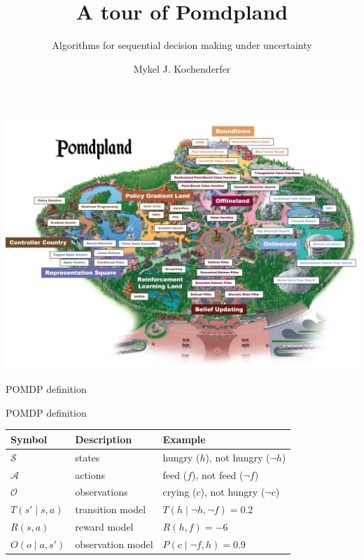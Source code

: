 \documentclass{beamer}
\title{A tour of Pomdpland}
\subtitle{Algorithms for sequential decision making under uncertainty}
\author{Mykel J. Kochenderfer}
\institute{Stanford University}
\begin{document}
\maketitle

\begin{frame}
    \includegraphics[width=\columnwidth]{pomdpland-small.jpeg}
\end{frame}

\begin{frame}{POMDP definition}
\begin{center}
\end{center}    
\end{frame}

\begin{frame}{POMDP definition}
    \centering
    \begin{tabular}{@{}lll@{}} \toprule
        Symbol & Description & Example \\ \midrule
        $\mathcal S$ & states & hungry ($h$), not hungry ($\neg h$)\\
        $\mathcal A$ & actions & feed ($f$), not feed ($\neg f$)\\
        $\mathcal O$ & observations & crying ($c$), not hungry ($\neg c$)\\ \midrule
        $T(s' \mid s, a)$ & transition model & $T(h \mid \neg h, \neg f) = 0.2$\\
        $R(s, a)$ & reward model & $R(h, f) = -6$ \\
        $O(o \mid a, s')$ & observation model & $P(c \mid \neg f, h) = 0.9$ \\
        \bottomrule
    \end{tabular}   
\end{frame}
\end{document}
